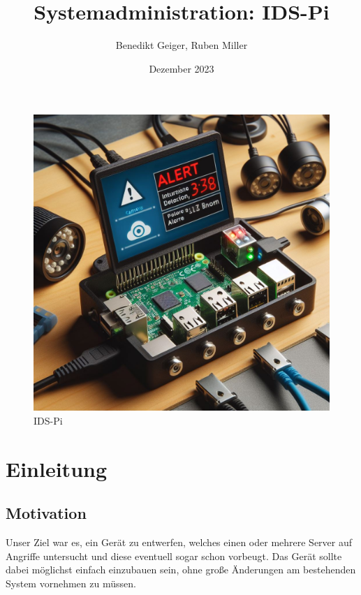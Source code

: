 \documentclass{article}
\title{Systemadministration: IDS-Pi}
\author{Benedikt Geiger, Ruben Miller}
\date{Dezember 2023}
\begin{document}
\maketitle

\begin{figure}[h]
    \centering
    \includegraphics[width=\textwidth]{assets/IDS-Pi.jpeg}
    \caption[\href{https://www.bing.com/images/create/intrusion-detection-raspberrypi/1-6579be6948a14dbdab119cddd71c0c67?id=DfTnKrjy7FJxcz\%2BHxST3Kw\%3D\%3D&view=detailv2&idpp=genimg&idpclose=1&FORM=SYDBIC}{Titelbild von Bing}]{\label{fig:IDS-Pi}IDS-Pi}
\end{figure}

\tableofcontents

\vfil \break

\section{Einleitung}

\subsection{Motivation}
Unser Ziel war es, ein Gerät zu entwerfen, welches einen oder mehrere Server auf Angriffe untersucht und diese eventuell sogar schon vorbeugt. Das Gerät sollte dabei möglichst einfach einzubauen sein, ohne große Änderungen am bestehenden System vornehmen zu müssen.
\end{document}

